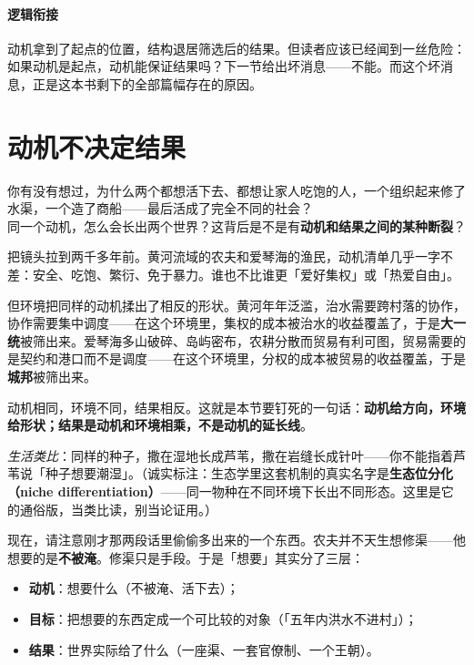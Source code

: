 \documentclass[../../main2.tex]{subfiles}
\begin{document}
	\paragraph*{逻辑衔接}
	动机拿到了起点的位置，结构退居筛选后的结果。但读者应该已经闻到一丝危险：如果动机是起点，动机能保证结果吗？下一节给出坏消息——不能。而这个坏消息，正是这本书剩下的全部篇幅存在的原因。

	\section{动机不决定结果}
	\label{sec:mot-result}

	\begin{readingnote}
		你有没有想过，为什么两个都想活下去、都想让家人吃饱的人，一个组织起来修了水渠，一个造了商船——最后活成了完全不同的社会？\\
		同一个动机，怎么会长出两个世界？这背后是不是有\textbf{动机和结果之间的某种断裂}？
	\end{readingnote}

	把镜头拉到两千多年前。黄河流域的农夫和爱琴海的渔民，动机清单几乎一字不差：安全、吃饱、繁衍、免于暴力。谁也不比谁更「爱好集权」或「热爱自由」。

	但环境把同样的动机揉出了相反的形状。黄河年年泛滥，治水需要跨村落的协作，协作需要集中调度——在这个环境里，集权的成本被治水的收益覆盖了，于是\textbf{大一统}被筛出来。爱琴海多山破碎、岛屿密布，农耕分散而贸易有利可图，贸易需要的是契约和港口而不是调度——在这个环境里，分权的成本被贸易的收益覆盖，于是\textbf{城邦}被筛出来。

	动机相同，环境不同，结果相反。这就是本节要钉死的一句话：\textbf{动机给方向，环境给形状；结果是动机和环境相乘，不是动机的延长线}。

	\textit{生活类比}：同样的种子，撒在湿地长成芦苇，撒在岩缝长成针叶——你不能指着芦苇说「种子想要潮湿」。（诚实标注：生态学里这套机制的真实名字是\textbf{生态位分化（niche differentiation）}——同一物种在不同环境下长出不同形态。这里是它的通俗版，当类比读，别当论证用。）

	现在，请注意刚才那两段话里偷偷多出来的一个东西。农夫并不天生想修渠——他想要的是\textbf{不被淹}。修渠只是手段。于是「想要」其实分了三层：
	\begin{itemize}
		\item \textbf{动机}：想要什么（不被淹、活下去）；
		\item \textbf{目标}：把想要的东西定成一个可比较的对象（「五年内洪水不进村」）；
		\item \textbf{结果}：世界实际给了什么（一座渠、一套官僚制、一个王朝）。
	\end{itemize}
\end{document}
